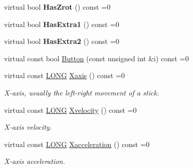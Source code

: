 \begin{DoxyCompactItemize}
virtual bool {\bfseries Has\+Zrot} () const =0
\item 
\mbox{\label{struct_x_input_joypad_a71ed4588a01d83d35d30f09746c93151}} 
virtual bool {\bfseries Has\+Extra1} () const =0
\item 
\mbox{\label{struct_x_input_joypad_adb69c84c61f7edc6de596a5bbe4306d6}} 
virtual bool {\bfseries Has\+Extra2} () const =0
\item 
virtual const bool \hyperlink{struct_x_input_joypad_a13cc187aae10747b0376cb1ed3710b5a}{Button} (const unsigned int \&i) const =0
\item 
\mbox{\label{struct_x_input_joypad_af576c7afbf80332fd720903293ddc958}} 
virtual const \hyperlink{_joypad_8h_a2a3e0cda5f1249bef6db47c5eb8e3813}{L\+O\+NG} \hyperlink{struct_x_input_joypad_af576c7afbf80332fd720903293ddc958}{Xaxis} () const =0
\begin{DoxyCompactList}\small\item\em X-\/axis, usually the left-\/right movement of a stick. \end{DoxyCompactList}\item 
\mbox{\label{struct_x_input_joypad_af4753b9643cfa1f2c1cc71bca92c3be8}} 
virtual const \hyperlink{_joypad_8h_a2a3e0cda5f1249bef6db47c5eb8e3813}{L\+O\+NG} \hyperlink{struct_x_input_joypad_af4753b9643cfa1f2c1cc71bca92c3be8}{Xvelocity} () const =0
\begin{DoxyCompactList}\small\item\em X-\/axis velocity. \end{DoxyCompactList}\item 
\mbox{\label{struct_x_input_joypad_aa2e1a4b890b2bdeb94b5df3a6103cb3d}} 
virtual const \hyperlink{_joypad_8h_a2a3e0cda5f1249bef6db47c5eb8e3813}{L\+O\+NG} \hyperlink{struct_x_input_joypad_aa2e1a4b890b2bdeb94b5df3a6103cb3d}{Xacceleration} () const =0
\begin{DoxyCompactList}\small\item\em X-\/axis acceleration. \end{DoxyCompactList}\item 
\mbox{\label{struct_x_input_joypad_a44f5f31e6f0f63e3708dd4f73fe385df}} 

\end{DoxyCompactItemize}
